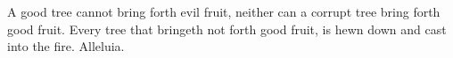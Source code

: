 A good tree cannot bring forth evil fruit, neither can a corrupt tree bring forth good fruit. Every tree that bringeth not forth good fruit, is hewn down and cast into the fire. Alleluia.
